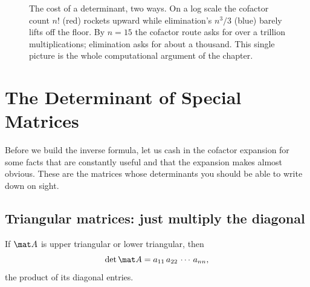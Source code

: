 \begin{figure}[H]
\centering
{}
\caption{The cost of a determinant, two ways. On a log scale the cofactor count $n!$ (red) rockets
upward while elimination's $n^3/3$ (blue) barely lifts off the floor. By $n=15$ the cofactor route
asks for over a trillion multiplications; elimination asks for about a thousand. This single picture
is the whole computational argument of the chapter.}
\label{ch22:fig-cost}
\end{figure}

\section{The Determinant of Special Matrices}

Before we build the inverse formula, let us cash in the cofactor expansion for some facts that are
constantly useful and that the expansion makes almost obvious. These are the matrices whose
determinants you should be able to write down on sight.

\subsection{Triangular matrices: just multiply the diagonal}

\begin{theorem}\label{ch22:thm-triangular}
If $\mat A$ is upper triangular or lower triangular, then
\[
\det\mat A = a_{11}\,a_{22}\,\cdots\,a_{nn},
\]
the product of its diagonal entries.
\end{theorem}

